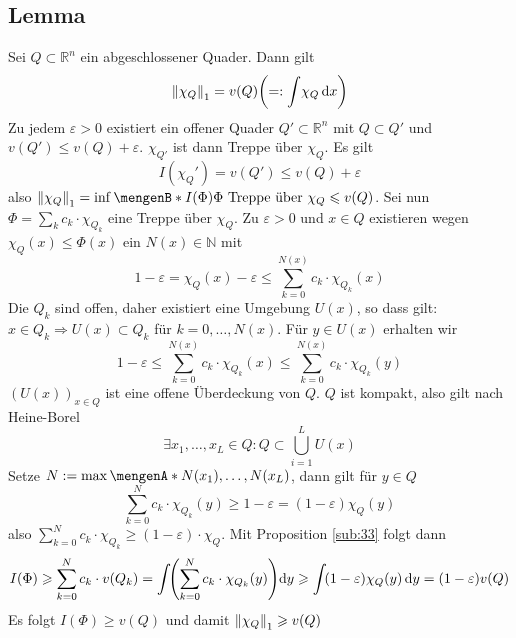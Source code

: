 \subsection[{Lemma: Volumen eines abgeschlossenen Quaders $Q$ entspricht $\norm[1]{\chi_Q} $}]{Lemma} %
\label{sub:310}
Sei $Q \subset \mathds{R}^n$ ein abgeschlossener Quader. Dann gilt 
\[
	\norm[1]{\chi_Q} = v(Q) \enbrace*{=: \int\! \chi_Q  \, \mathrm{d}x  }
\]
Zu jedem $\varepsilon>0$ existiert ein offener Quader $Q' \subset \mathds{R}^n$ mit $Q \subset Q'$ und $v(Q') \le v(Q) + \varepsilon$. $\chi_{Q'}$ ist dann Treppe über 
$\chi_Q$. Es gilt
\[
	I(\chi_Q') = v(Q') \le v(Q)+ \varepsilon
\]
also $\norm[1]{\chi_Q} = \inf \set[I(\Phi)]{\Phi \text{ Treppe über }\chi_Q} \le v(Q) $. Sei nun $\Phi = \sum_k c_k \cdot \chi_{Q_k}$ eine Treppe über $\chi_Q$. Zu 
$\varepsilon>0$ und $x\in Q$ existieren wegen $\chi_Q (x) \le \Phi(x)$ ein $N(x) \in \mathds{N}$ mit 
\[
	1- \varepsilon = \chi_Q(x) - \varepsilon \le \sum_{k=0}^{N(x)} c_k \cdot \chi_{Q_k}(x)
\]
Die $Q_k$ sind offen, daher existiert eine Umgebung $U(x)$, so dass gilt: $x \in Q_k \Rightarrow U(x) \subset Q_k$ für $k=0,\ldots ,N(x)$. Für $y \in U(x)$ erhalten wir
\[
	1- \varepsilon \le \sum_{k=0}^{N(x)} c_k \cdot \chi_{Q_k}(x) \le \sum_{k=0}^{N(x)} c_k \cdot \chi_{Q_k}(y)  
\]
$(U(x))_{x \in Q}$ ist eine offene Überdeckung von $Q$. $Q$  ist kompakt, also gilt nach Heine-Borel
\[
	\exists x_1, \ldots , x_L \in Q : Q \subset \bigcup_{i=1}^L U(x)
\]
Setze $N := \max \set{N(x_1), \ldots , N(x_L)} $, dann gilt für $y \in Q$
\[
	\sum_{k=0}^{N} c_k \cdot \chi_{Q_k}(y) \ge 1- \varepsilon = (1- \varepsilon) \chi_{Q}(y) 
\]
also $\sum_{k=0}^{N} c_k \cdot \chi_{Q_k} \ge (1-\varepsilon) \cdot \chi_Q $. Mit Proposition \ref{sub:33} folgt dann
\begin{align*}
	I(\Phi) \ge \sum_{k=0}^{N} c_k \cdot v(Q_k) = \int \! \enbrace*{\sum_{k=0}^{N} c_k \cdot \chi_{Q_k}(y) } \mathrm{d}y  \ge \int\! (1-\varepsilon) \chi_{Q}(y)  \, \mathrm{d}y = (1-\varepsilon) v(Q)
\end{align*}
Es folgt $I(\Phi) \ge v(Q)$ und damit $\norm[1]{\chi_Q} \ge v(Q)$ \bewende

